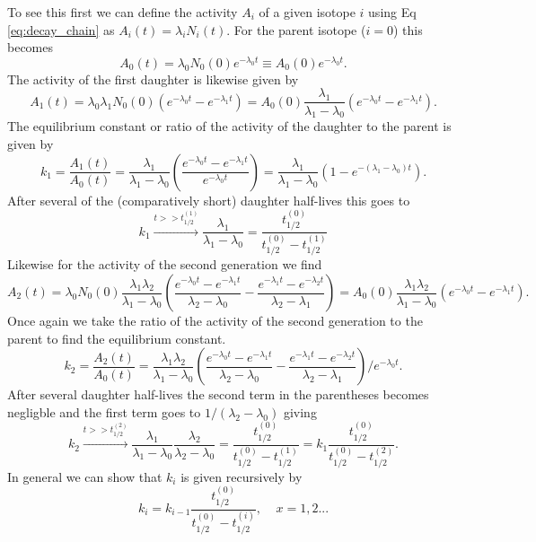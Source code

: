 \documentclass[11pt]{article}
\begin{document}
To see this first we can define the activity $A_i$ of a given isotope $i$ using Eq \ref{eq:decay_chain} as $A_i(t)=\lambda_iN_i(t)$. For the parent isotope ($i=0$) this becomes
\begin{equation}
\label{eq:p_activity}
A_0(t)=\lambda_0N_0(0)e^{-\lambda_0t}\equiv A_0(0)e^{-\lambda_0t}.
\end{equation}
The activity of the first daughter is likewise given by
\begin{equation}
\label{eq:d1_activity}
A_1(t)=\lambda_0\lambda_1N_0(0)\left(e^{-\lambda_0t}-e^{-\lambda_1t}\right)=A_0(0)\frac{\lambda_1}{\lambda_1-\lambda_0}\left(e^{-\lambda_0t}-e^{-\lambda_1t}\right).
\end{equation}
The equilibrium constant or ratio of the activity of the daughter to the parent is given by 
\begin{equation}
\label{eq:equil_const_1}
k_1=\frac{A_1(t)}{A_0(t)}=\frac{\lambda_1}{\lambda_1-\lambda_0}\left(\frac{e^{-\lambda_0t}-e^{-\lambda_1t}}{e^{-\lambda_0t}}\right)=\frac{\lambda_1}{\lambda_1-\lambda_0}\left(1-e^{-(\lambda_1-\lambda_0)t}\right).
\end{equation}
After several of the (comparatively short) daughter half-lives this goes to 
\begin{equation}
\label{eq:k1}
 k_1\xrightarrow[~]{t>>t_{1/2}^{(1)}}\frac{\lambda_1}{\lambda_1-\lambda_0}=\frac{t_{1/2}^{(0)}}{t_{1/2}^{(0)}-t_{1/2}^{(1)}}
\end{equation}
Likewise for the activity of the second generation we find
\begin{equation}
\label{eq:d1_activity}
A_2(t)=\lambda_0N_0(0)\frac{\lambda_1\lambda_2}{\lambda_1-\lambda_0}\left(\frac{e^{-\lambda_0t}-e^{-\lambda_1t}}{\lambda_2-\lambda_0}-\frac{e^{-\lambda_1t}-e^{-\lambda_2t}}{\lambda_2-\lambda_1}\right)=A_0(0)\frac{\lambda_1\lambda_2}{\lambda_1-\lambda_0}\left(e^{-\lambda_0t}-e^{-\lambda_1t}\right).
\end{equation}
Once again we take the ratio of the activity of the second generation to the parent to find the equilibrium constant.
\begin{equation}
\label{eq:equil_const_2}
k_2=\frac{A_2(t)}{A_0(t)}=\frac{\lambda_1\lambda_2}{\lambda_1-\lambda_0}\left(\frac{e^{-\lambda_0t}-e^{-\lambda_1t}}{\lambda_2-\lambda_0}-\frac{e^{-\lambda_1t}-e^{-\lambda_2t}}{\lambda_2-\lambda_1}\right)\Big/e^{-\lambda_0t}.
\end{equation}
After several daughter half-lives the second term in the parentheses becomes negligble and the first term goes to $1/(\lambda_2-\lambda_0)$ giving
\begin{equation}
\label{eq:k2}
k_2\xrightarrow[~]{t>>t_{1/2}^{(2)}}\frac{\lambda_1}{\lambda_1-\lambda_0}\frac{\lambda_2}{\lambda_2-\lambda_0}=\frac{t_{1/2}^{(0)}}{t_{1/2}^{(0)}-t_{1/2}^{(1)}}=k_1\frac{t_{1/2}^{(0)}}{t_{1/2}^{(0)}-t_{1/2}^{(2)}}.
\end{equation}
In general we can show that $k_i$ is given recursively by
\[
k_i=k_{i-1}\frac{t_{1/2}^{(0)}}{t_{1/2}^{(0)}-t_{1/2}^{(i)}},~~~~~x=1,2...
\]
\end{document}
